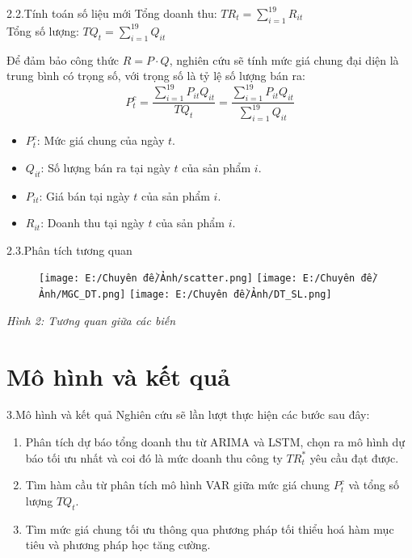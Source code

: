 \documentclass{beamer}
\begin{document}
    \begin{frame}{2.2.Tính toán số liệu mới}
    	    \baselineskip=18pt
    		Tổng doanh thu:\quad
    		$TR_t = \sum_{i=1}^{19}  R_{it}$\\
    		Tổng số lượng:\quad
    		$TQ_t = \sum_{i=1}^{19}  Q_{it}
    		$
    	
    	
    		Để đảm bảo công thức $R = P \cdot Q$, nghiên cứu sẽ tính mức giá chung đại diện là trung bình có trọng số, với trọng số là tỷ lệ số lượng bán ra:
    		\[
    		P_t^c = \frac{\sum_{i=1}^{19} P_{it} Q_{it}}{TQ_t} = \frac{\sum_{i=1}^{19} P_{it} Q_{it}}{\sum_{i=1}^{19} Q_{it}}
    		\]
    	
    	
 
    	\begin{itemize}
    			\item $P_t^c$: Mức giá chung của ngày $t$.
    			\item $Q_{it}$: Số lượng bán ra tại ngày $t$ của sản phẩm $i$.
    			\item $P_{it}$: Giá bán tại ngày $t$ của sản phẩm $i$.
    			\item $R_{it}$: Doanh thu tại ngày $t$ của sản phẩm $i$.
    	\end{itemize}
    \end{frame}
    
    	\begin{frame}{2.3.Phân tích tương quan}
    	\begin{figure}
    		\centering
    		\texttt{[image: E:/Chuyên đề/Ảnh/scatter.png]}
    		\hfill
    		\texttt{[image: E:/Chuyên đề/Ảnh/MGC\_DT.png]}
    		\hfill
    		\texttt{[image: E:/Chuyên đề/Ảnh/DT\_SL.png]}
    	\end{figure}
    	\vspace{0.01cm}
    	\centering
    	\textit{Hình 2: Tương quan giữa các biến }
    \end{frame}
    
  \section{Mô hình và kết quả}
	\begin{frame}{3.Mô hình và kết quả}
		Nghiên cứu sẽ lần lượt thực hiện các bước sau đây:
		\begin{enumerate}
			\item Phân tích dự báo tổng doanh thu từ ARIMA và LSTM, chọn ra mô hình dự báo tối ưu nhất và coi đó là mức doanh thu công ty $TR_t^*$ yêu cầu đạt được.
			\item Tìm hàm cầu từ phân tích mô hình VAR giữa mức giá chung $P_t^c$ và tổng số lượng $TQ_t$.
			\item Tìm mức giá chung tối ưu thông qua phương pháp tối thiểu hoá hàm mục tiêu và phương pháp học tăng cường.
		\end{enumerate}
	\end{frame}
				
\end{document}
